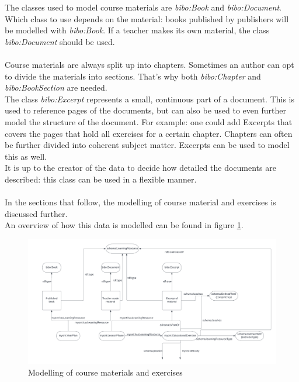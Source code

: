 \documentclass[a4paper]{report}
\begin{document}
    \noindent The classes used to model course materials are \textit{bibo:Book} and \textit{bibo:Document}.
    Which class to use depends on the material: books published by publishers will be modelled with \textit{bibo:Book}.
    If a teacher makes its own material, the class \textit{bibo:Document} should be used.\\ \\
    Course materials are always split up into chapters. Sometimes an author can opt to divide the materials into sections. That's why both \textit{bibo:Chapter} and \textit{bibo:BookSection} are needed.\\
    The class \textit{bibo:Excerpt} represents a small, continuous part of a document. This is used to reference pages of the documents, but can also be used to even further model the structure of the document.
    For example: one could add Excerpts that covers the pages that hold all exercises for a certain chapter.
    Chapters can often be further divided into coherent subject matter. Excerpts can be used to model this as well.\\
    It is up to the creator of the data to decide how detailed the documents are described: this class can be used in a flexible manner.\\ \\
    In the sections that follow, the modelling of course material and exercises is discussed further.\\
    An overview of how this data is modelled can be found in figure \ref{fig:uml-materialdata}.

    \begin{figure}[h]
        \centering
        \caption{Modelling of course materials and exercises}
        \label{fig:uml-materialdata}
        \includegraphics[scale=0.5]{uml-materialdata.png}
    \end{figure}
\end{document}
